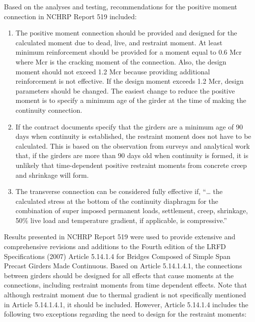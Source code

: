 Based on the analyses and testing, recommendations for the positive moment connection in NCHRP Report 519 included:

\begin{enumerate}
  \item The positive moment connection should be provided and designed for the calculated moment due to dead, live, and restraint moment. At least minimum reinforcement should be provided for a moment equal to 0.6 Mcr where Mcr is the cracking moment of the connection. Also, the design moment should not exceed 1.2 Mcr because providing additional reinforcement is not effective. If the design moment exceeds 1.2 Mcr, design parameters should be changed. The easiest change to reduce the positive moment is to specify a minimum age of the girder at the time of making the continuity connection.
  \item If the contract documents specify that the girders are a minimum age of 90 days when continuity is established, the restraint moment does not have to be calculated. This is based on the observation from surveys and analytical work that, if the girders are more than 90 days old when continuity is formed, it is unlikely that time-dependent positive restraint moments from concrete creep and shrinkage will form.
  \item The transverse connection can be considered fully effective if, “… the calculated stress at the bottom of the continuity diaphragm for the combination of super imposed permanent loads, settlement, creep, shrinkage, 50\% live load and temperature gradient, if applicable, is compressive.”
\end{enumerate}

Results presented in NCHRP Report 519 were used to provide extensive and comprehensive revisions and additions to the Fourth edition of the LRFD Specifications (2007) Article 5.14.1.4 for Bridges Composed of Simple Span Precast Girders Made Continuous. Based on Article 5.14.1.4.1, the connections between girders should be designed for all effects that cause moments at the connections, including restraint moments from time dependent effects. Note that although restraint moment due to thermal gradient is not specifically mentioned in Article 5.14.1.4.1, it should be included. However, Article 5.14.1.4 includes the following two exceptions regarding the need to design for the restraint moments:

